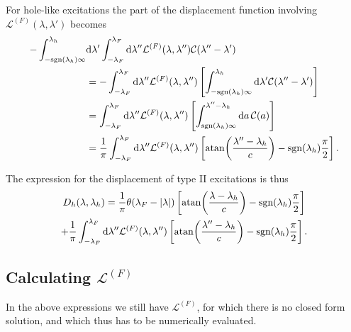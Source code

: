 \documentclass[11pt, a4paper,draft]{report} %
\newcommand{\inversetruncc}{\mathcal{L}}
\newcommand{\kernel}{\mathcal{C}}
\begin{document}
For hole-like excitations the part of the displacement function involving \(\inversetruncc^{(F)}(\lambda,\lambda')\) becomes
\begin{align}
	 - \int_{-\textrm{sgn}(\lambda_h)\infty}^{\lambda_h} &\dd \lambda' \int_{-\lambda_F}^{\lambda_F} \dd \lambda''  \inversetruncc^{(F)}(\lambda,\lambda'') \kernel(\lambda''-\lambda')\\
	 &= - \int_{-\lambda_F}^{\lambda_F} \dd \lambda''  \inversetruncc^{(F)}(\lambda,\lambda'')\left[ \int_{-\textrm{sgn}(\lambda_h)\infty}^{\lambda_h} \dd \lambda' \kernel(\lambda''-\lambda')\right]\\
	 &= \int_{-\lambda_F}^{\lambda_F} \dd \lambda''  \inversetruncc^{(F)}(\lambda,\lambda'')\left[ \int_{\textrm{sgn}(\lambda_h)\infty}^{\lambda''-\lambda_h} \dd a \, \kernel(a)\right]\\
	 &= \frac{1}{\pi}\int_{-\lambda_F}^{\lambda_F} \dd  \lambda''  \inversetruncc^{(F)}(\lambda,\lambda'')\left[ \atan(\frac{\lambda''-\lambda_h}{c}) - \textrm{sgn}(\lambda_h)\frac{\pi}{2}\right].
\end{align}

The expression for the displacement of type II excitations is thus
\begin{multline}
	D_h(\lambda, \lambda_h) = \frac{1}{\pi}\theta(\lambda_F - \lvert \lambda \rvert) \left[ \atan(\frac{\lambda-\lambda_h}{c}) - \textrm{sgn}(\lambda_h)\frac{\pi}{2}\right] \\+
	\frac{1}{\pi}\int_{-\lambda_F}^{\lambda_F} \dd  \lambda''  \inversetruncc^{(F)}(\lambda,\lambda'')\left[ \atan(\frac{\lambda''-\lambda_h}{c}) - \textrm{sgn}(\lambda_h)\frac{\pi}{2}\right].
\end{multline}

\subsection{Calculating \(\inversetruncc^{(F)}\)}

In the above expressions we still have \(\inversetruncc^{(F)}\), for which there is no closed form solution, and which thus has to be numerically evaluated.
\end{document}
